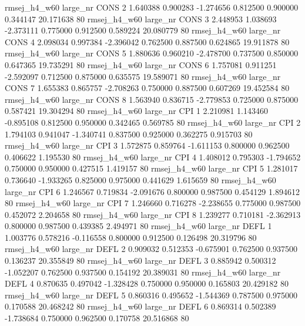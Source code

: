 rmsej_h4_w60   large_nr     CONS                 2  1.640388  0.900283  -1.274656 0.812500 0.900000  0.344147   20.171638 80
rmsej_h4_w60   large_nr     CONS                 3  2.448953  1.038693  -2.373111 0.775000 0.912500  0.589224   20.080779 80
rmsej_h4_w60   large_nr     CONS                 4  2.098034  0.997384  -2.396042 0.762500 0.887500  0.624865   19.911878 80
rmsej_h4_w60   large_nr     CONS                 5  1.880636  0.960210  -2.478700 0.737500 0.850000  0.647365   19.735291 80
rmsej_h4_w60   large_nr     CONS                 6  1.757081  0.911251  -2.592097 0.712500 0.875000  0.635575   19.589071 80
rmsej_h4_w60   large_nr     CONS                 7  1.655383  0.865757  -2.708263 0.750000 0.887500  0.607269   19.452584 80
rmsej_h4_w60   large_nr     CONS                 8  1.563940  0.836715  -2.779853 0.725000 0.875000  0.587421   19.304294 80
rmsej_h4_w60   large_nr      CPI                 1  2.210981  1.143460  -0.895108 0.812500 0.950000  0.342465    0.569785 80
rmsej_h4_w60   large_nr      CPI                 2  1.794103  0.941047  -1.340741 0.837500 0.925000  0.362275    0.915703 80
rmsej_h4_w60   large_nr      CPI                 3  1.572875  0.859764  -1.611153 0.800000 0.962500  0.406622    1.195530 80
rmsej_h4_w60   large_nr      CPI                 4  1.408012  0.795303  -1.794652 0.750000 0.950000  0.427515    1.419157 80
rmsej_h4_w60   large_nr      CPI                 5  1.281017  0.736640  -1.933265 0.825000 0.975000  0.441629    1.615659 80
rmsej_h4_w60   large_nr      CPI                 6  1.246567  0.719834  -2.091676 0.800000 0.987500  0.454129    1.894612 80
rmsej_h4_w60   large_nr      CPI                 7  1.246660  0.716278  -2.238655 0.775000 0.987500  0.452072    2.204658 80
rmsej_h4_w60   large_nr      CPI                 8  1.239277  0.710181  -2.362913 0.800000 0.987500  0.439385    2.494971 80
rmsej_h4_w60   large_nr     DEFL                 1  1.003776  0.578216  -0.116558 0.800000 0.912500  0.126498   20.319796 80
rmsej_h4_w60   large_nr     DEFL                 2  0.909032  0.512353  -0.675901 0.762500 0.937500  0.136237   20.355849 80
rmsej_h4_w60   large_nr     DEFL                 3  0.885942  0.500312  -1.052207 0.762500 0.937500  0.154192   20.389031 80
rmsej_h4_w60   large_nr     DEFL                 4  0.870635  0.497042  -1.328428 0.750000 0.950000  0.165803   20.429182 80
rmsej_h4_w60   large_nr     DEFL                 5  0.860316  0.495652  -1.544369 0.787500 0.975000  0.170588   20.468242 80
rmsej_h4_w60   large_nr     DEFL                 6  0.869314  0.502389  -1.738684 0.750000 0.962500  0.170758   20.516868 80
